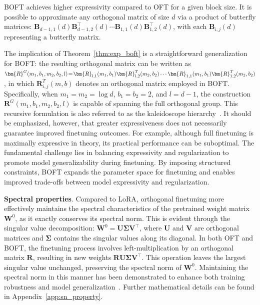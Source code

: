 \begin{theorem}\label{thm:exp_boft}
    BOFT achieves higher expressivity compared to OFT for a given block size. It is possible to approximate any orthogonal matrix of size $d$ via a product of butterfly matrices: $\bm{B}_{d-1,1}(d)\bm{B}^\top_{d-1,2}(d)\cdots\bm{B}_{1,1}(d)\bm{B}^\top_{1,2}(d)$, with each $\bm{B}_{i,j}(d)$ representing a butterfly matrix.
\end{theorem}

The implication of Theorem~\ref{thm:exp_boft} is a straightforward generalization for BOFT: the resulting orthogonal matrix can be written as $\thickmuskip=2mu \medmuskip=2mu \bm{R}^G(m_1,b_1,m_2,b_2,l)=\bm{R}_{l,1}(m_1,b_1)\bm{R}_{l,2}^T(m_2,b_2)\cdots\bm{R}_{1,1}(m_1,b_1)\bm{R}_{1,2}^T(m_2,b_2)$, in which $\bm{R}_{i,j}^T(m,b)$ denotes an orthogonal matrix employed in BOFT. Specifically, when $m_1=m_2=\log d$, $b_1=b_2=2$, and $l=d-1$, the construction $\bm{R}^G(m_1,b_1,m_2,b_2,l)$ is capable of spanning the full orthogonal group. This recursive formulation is also referred to as the kaleidoscope hierarchy~\cite{dao2019kaleidoscope}. It should be emphasized, however, that greater expressiveness does not necessarily guarantee improved finetuning outcomes. For example, although full finetuning is maximally expressive in theory, its practical performance can be suboptimal. The fundamental challenge lies in balancing expressivity and regularization to promote model generalizability during finetuning. By imposing structured constraints, BOFT expands the parameter space for finetuning and enables improved trade-offs between model expressivity and regularization.

\textbf{Spectral properties}. Compared to LoRA, orthogonal finetuning more effectively maintains the spectral characteristics of the pretrained weight matrix $\bm{W}^0$, as it exactly conserves its spectral norm. This is evident through the singular value decomposition: $\bm{W}^0 = \bm{U}\bm{\Sigma}\bm{V}^\top$, where $\bm{U}$ and $\bm{V}$ are orthogonal matrices and $\bm{\Sigma}$ contains the singular values along its diagonal. In both OFT and BOFT, the finetuning process involves left-multiplication by an orthogonal matrix $\bm{R}$, resulting in new weights $\bm{R}\bm{U}\bm{\Sigma}\bm{V}^\top$. This operation leaves the largest singular value unchanged, preserving the spectral norm of $\bm{W}^0$. Maintaining the spectral norm in this manner has been demonstrated to enhance both training robustness and model generalization~\cite{miyato2018spectral, yoshida2017spectral}. Further mathematical details can be found in Appendix~\ref{app:sn_property}.

